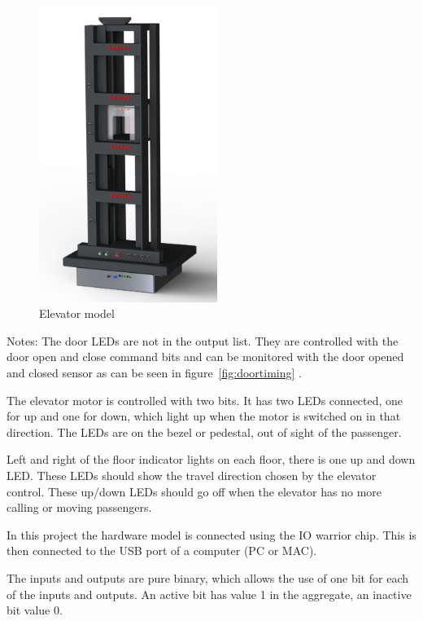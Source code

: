 \begin{figure}
  \vspace{-1\baselineskip}
  \begin{center}
    \includegraphics[width=58mm]{figures/lift2.png}
  \end{center}
  \vspace{-1\baselineskip}
  \caption{Elevator model}
  \label{fig:lift}
  \vspace{-1\baselineskip}
\end{figure}
Notes: The door LEDs are not in the output list. They are controlled
with the door open and close command bits and can be monitored with the door
opened and closed sensor as can be seen in figure~\ref{fig:doortiming}
. 

The elevator motor is controlled with two bits. It has two LEDs
connected, one for up and one for down, which light up when the motor
is switched on in that direction. The LEDs are on the bezel or
pedestal, out of sight of the passenger.

Left and right of the floor indicator lights on
each floor, there is one up and down LED. These LEDs should show the
travel direction chosen by the elevator control. These up/down LEDs
should go off when the elevator has no more calling or moving passengers.

In this project the hardware model is connected using the IO warrior
chip. This is then connected to the USB port of a computer (PC or
MAC). 

The inputs and outputs are pure binary, which allows  the use of one
bit for each of the inputs and outputs. An active bit has value 1 in
the aggregate, an inactive bit value 0.


